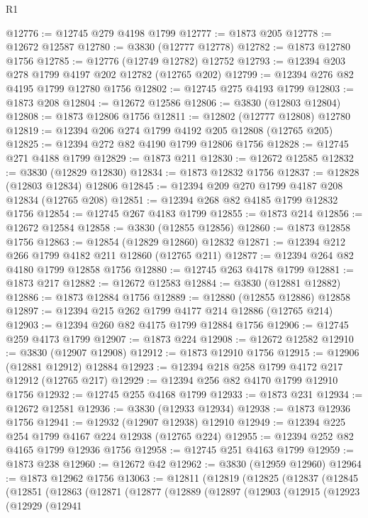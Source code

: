 \begin{lexlean}{R1}
\begin{coremodule}
@12776 := @12745 @279 @4198 @1799
@12777 := @1873 @205
@12778 := @12672 @12587
@12780 := @3830 (@12777 @12778)
@12782 := @1873 @12780 @1756
@12785 := @12776 (@12749 @12782) @12752
@12793 := @12394 @203 @278 @1799 @4197 @202 @12782 (@12765 @202)
@12799 := @12394 @276 @82 @4195 @1799 @12780 @1756
@12802 := @12745 @275 @4193 @1799
@12803 := @1873 @208
@12804 := @12672 @12586
@12806 := @3830 (@12803 @12804)
@12808 := @1873 @12806 @1756
@12811 := @12802 (@12777 @12808) @12780
@12819 := @12394 @206 @274 @1799 @4192 @205 @12808 (@12765 @205)
@12825 := @12394 @272 @82 @4190 @1799 @12806 @1756
@12828 := @12745 @271 @4188 @1799
@12829 := @1873 @211
@12830 := @12672 @12585
@12832 := @3830 (@12829 @12830)
@12834 := @1873 @12832 @1756
@12837 := @12828 (@12803 @12834) @12806
@12845 := @12394 @209 @270 @1799 @4187 @208 @12834 (@12765 @208)
@12851 := @12394 @268 @82 @4185 @1799 @12832 @1756
@12854 := @12745 @267 @4183 @1799
@12855 := @1873 @214
@12856 := @12672 @12584
@12858 := @3830 (@12855 @12856)
@12860 := @1873 @12858 @1756
@12863 := @12854 (@12829 @12860) @12832
@12871 := @12394 @212 @266 @1799 @4182 @211 @12860 (@12765 @211)
@12877 := @12394 @264 @82 @4180 @1799 @12858 @1756
@12880 := @12745 @263 @4178 @1799
@12881 := @1873 @217
@12882 := @12672 @12583
@12884 := @3830 (@12881 @12882)
@12886 := @1873 @12884 @1756
@12889 := @12880 (@12855 @12886) @12858
@12897 := @12394 @215 @262 @1799 @4177 @214 @12886 (@12765 @214)
@12903 := @12394 @260 @82 @4175 @1799 @12884 @1756
@12906 := @12745 @259 @4173 @1799
@12907 := @1873 @224
@12908 := @12672 @12582
@12910 := @3830 (@12907 @12908)
@12912 := @1873 @12910 @1756
@12915 := @12906 (@12881 @12912) @12884
@12923 := @12394 @218 @258 @1799 @4172 @217 @12912 (@12765 @217)
@12929 := @12394 @256 @82 @4170 @1799 @12910 @1756
@12932 := @12745 @255 @4168 @1799
@12933 := @1873 @231
@12934 := @12672 @12581
@12936 := @3830 (@12933 @12934)
@12938 := @1873 @12936 @1756
@12941 := @12932 (@12907 @12938) @12910
@12949 := @12394 @225 @254 @1799 @4167 @224 @12938 (@12765 @224)
@12955 := @12394 @252 @82 @4165 @1799 @12936 @1756
@12958 := @12745 @251 @4163 @1799
@12959 := @1873 @238
@12960 := @12672 @42
@12962 := @3830 (@12959 @12960)
@12964 := @1873 @12962 @1756
@13063 := @12811
    (@12819
      (@12825
        (@12837
          (@12845
            (@12851
              (@12863
                (@12871
                  (@12877
                    (@12889
                      (@12897
                        (@12903
                          (@12915
                            (@12923
                              (@12929
                                (@12941

\end{coremodule}
\end{lexlean}
